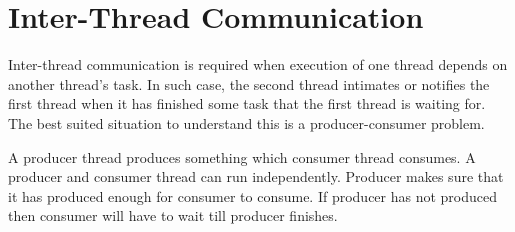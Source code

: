 \documentclass[11pt,a4paper]{article}
\begin{document}
\section*{Inter-Thread Communication}
Inter-thread communication is required when execution of one thread depends on another thread's task. In such case, the second thread intimates or notifies the first thread when it has finished some task that the first thread is waiting for. The best suited situation to understand this is a producer-consumer problem.

A producer thread produces something which consumer thread consumes. A producer and consumer thread can run independently. Producer makes sure that it has produced enough for consumer to consume. If producer has not produced then consumer will have to wait till producer finishes.

\end{document}

